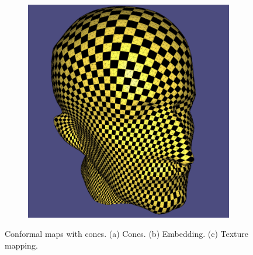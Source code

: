 \begin{figure}
\begin{subfigure}{0.25\textwidth}
\caption{}
\end{subfigure}\ \ \ \ \ \ \ \ \ 
\begin{subfigure}{0.25\textwidth}
\includegraphics[height = \textwidth]{images/max_global_texture}
\caption{}
\end{subfigure}
\caption{Conformal maps with cones. (a) Cones. (b) Embedding. (c) Texture mapping.}
\label{fig:cone}
\end{figure}












